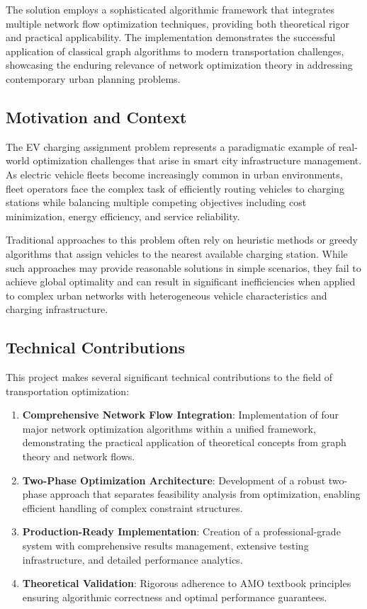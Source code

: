 \documentclass[12pt,a4paper]{article}
\begin{document}
The solution employs a sophisticated algorithmic framework that integrates multiple network flow optimization techniques, providing both theoretical rigor and practical applicability. The implementation demonstrates the successful application of classical graph algorithms to modern transportation challenges, showcasing the enduring relevance of network optimization theory in addressing contemporary urban planning problems.

\subsection{Motivation and Context}

The EV charging assignment problem represents a paradigmatic example of real-world optimization challenges that arise in smart city infrastructure management. As electric vehicle fleets become increasingly common in urban environments, fleet operators face the complex task of efficiently routing vehicles to charging stations while balancing multiple competing objectives including cost minimization, energy efficiency, and service reliability.

Traditional approaches to this problem often rely on heuristic methods or greedy algorithms that assign vehicles to the nearest available charging station. While such approaches may provide reasonable solutions in simple scenarios, they fail to achieve global optimality and can result in significant inefficiencies when applied to complex urban networks with heterogeneous vehicle characteristics and charging infrastructure.

\subsection{Technical Contributions}

This project makes several significant technical contributions to the field of transportation optimization:

\begin{enumerate}
\item \textbf{Comprehensive Network Flow Integration}: Implementation of four major network optimization algorithms within a unified framework, demonstrating the practical application of theoretical concepts from graph theory and network flows.

\item \textbf{Two-Phase Optimization Architecture}: Development of a robust two-phase approach that separates feasibility analysis from optimization, enabling efficient handling of complex constraint structures.

\item \textbf{Production-Ready Implementation}: Creation of a professional-grade system with comprehensive results management, extensive testing infrastructure, and detailed performance analytics.

\item \textbf{Theoretical Validation}: Rigorous adherence to AMO textbook principles ensuring algorithmic correctness and optimal performance guarantees.
\end{enumerate}
\end{document}
